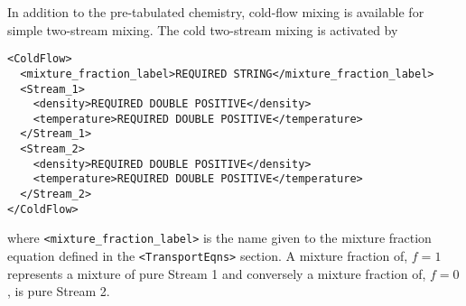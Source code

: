 In addition to the pre-tabulated chemistry, cold-flow mixing is available for simple two-stream mixing.  The cold two-stream mixing is activated by
%
\begin{Verbatim}[fontsize=\footnotesize]
<ColdFlow>
  <mixture_fraction_label>REQUIRED STRING</mixture_fraction_label>
  <Stream_1>
    <density>REQUIRED DOUBLE POSITIVE</density>
    <temperature>REQUIRED DOUBLE POSITIVE</temperature>
  </Stream_1>
  <Stream_2>
    <density>REQUIRED DOUBLE POSITIVE</density>
    <temperature>REQUIRED DOUBLE POSITIVE</temperature>
  </Stream_2>
</ColdFlow>
\end{Verbatim}
% 
where \verb=<mixture_fraction_label>= is the name given to the mixture fraction equation defined in the \verb=<TransportEqns>= section.  A mixture fraction of, $f=1$ represents a mixture of pure Stream 1 and conversely a mixture fraction of, $f=0$, is pure Stream 2.  














